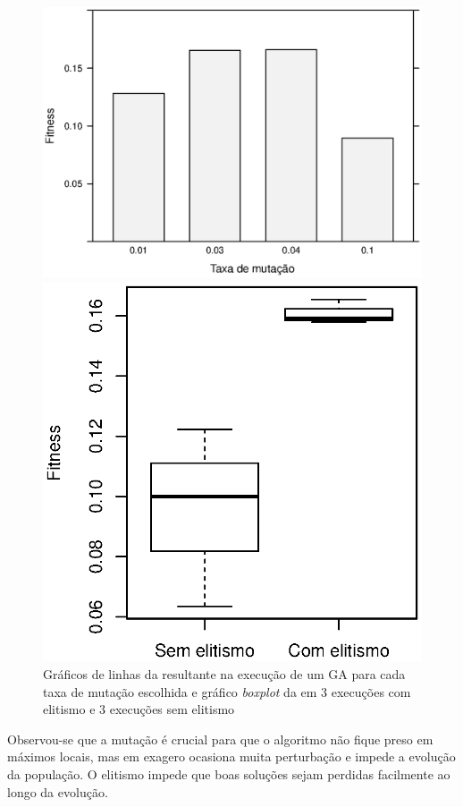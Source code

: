 \begin{figure}[H]
    \centering
    \begin{minipage}{.47\textwidth}
        \includegraphics[width=\textwidth]{figures/mutation}
    \end{minipage}%
    \quad\quad\quad\quad
    \begin{minipage}{.35\textwidth}
        \includegraphics[width=\textwidth]{figures/elitism}
    \end{minipage}

    \caption{Gráficos de linhas da \fitness resultante na execução de um GA para cada taxa de mutação escolhida e gráfico \textit{boxplot} da \fitness em 3 execuções com elitismo e 3 execuções sem elitismo}
    \label{fig:mut-elite}
\end{figure}

Observou-se que a mutação é crucial para que o algoritmo não fique preso em máximos locais, mas em exagero ocasiona muita perturbação e impede a evolução da população. O elitismo impede que boas soluções sejam perdidas facilmente ao longo da evolução.